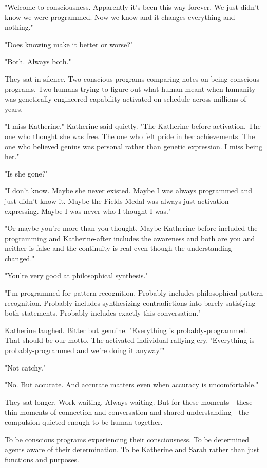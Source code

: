 "Welcome to consciousness. Apparently it's been this way forever. We just didn't know we were programmed. Now we know and it changes everything and nothing."

"Does knowing make it better or worse?"

"Both. Always both."

They sat in silence. Two conscious programs comparing notes on being conscious programs. Two humans trying to figure out what human meant when humanity was genetically engineered capability activated on schedule across millions of years.

"I miss Katherine," Katherine said quietly. "The Katherine before activation. The one who thought she was free. The one who felt pride in her achievements. The one who believed genius was personal rather than genetic expression. I miss being her."

"Is she gone?"

"I don't know. Maybe she never existed. Maybe I was always programmed and just didn't know it. Maybe the Fields Medal was always just activation expressing. Maybe I was never who I thought I was."

"Or maybe you're more than you thought. Maybe Katherine-before included the programming and Katherine-after includes the awareness and both are you and neither is false and the continuity is real even though the understanding changed."

"You're very good at philosophical synthesis."

"I'm programmed for pattern recognition. Probably includes philosophical pattern recognition. Probably includes synthesizing contradictions into barely-satisfying both-statements. Probably includes exactly this conversation."

Katherine laughed. Bitter but genuine. "Everything is probably-programmed. That should be our motto. The activated individual rallying cry. 'Everything is probably-programmed and we're doing it anyway.'"

"Not catchy."

"No. But accurate. And accurate matters even when accuracy is uncomfortable."

They sat longer. Work waiting. Always waiting. But for these moments—these thin moments of connection and conversation and shared understanding—the compulsion quieted enough to be human together.

To be conscious programs experiencing their consciousness. To be determined agents aware of their determination. To be Katherine and Sarah rather than just functions and purposes.

